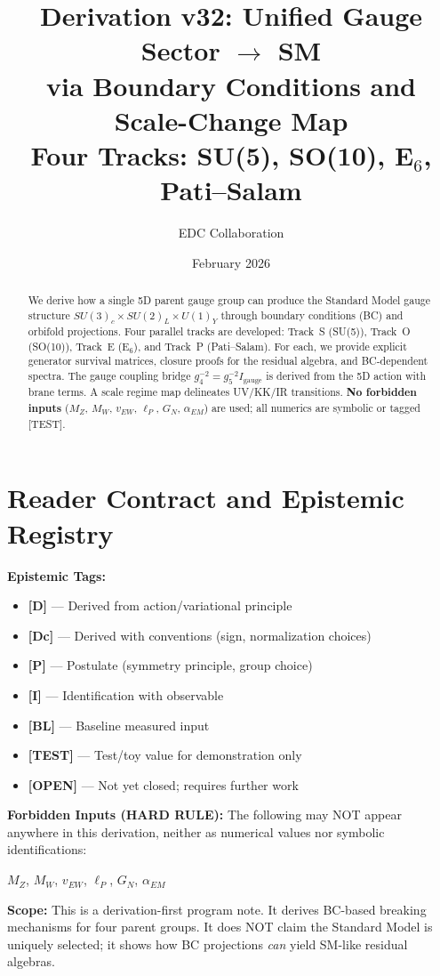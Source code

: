 \documentclass[11pt,a4paper]{article}
\title{Derivation v32: Unified Gauge Sector $\to$ SM\\
via Boundary Conditions and Scale-Change Map\\[0.5em]
\large Four Tracks: SU(5), SO(10), E$_6$, Pati--Salam}
\author{EDC Collaboration}
\date{February 2026}
\begin{document}
\maketitle

\begin{abstract}
We derive how a single 5D parent gauge group can produce the Standard Model gauge
structure $SU(3)_c \times SU(2)_L \times U(1)_Y$ through boundary conditions (BC) and
orbifold projections. Four parallel tracks are developed: Track~S (SU(5)), Track~O
(SO(10)), Track~E (E$_6$), and Track~P (Pati--Salam). For each, we provide explicit
generator survival matrices, closure proofs for the residual algebra, and BC-dependent
spectra. The gauge coupling bridge $g_4^{-2} = g_5^{-2} I_{\text{gauge}}$ is derived
from the 5D action with brane terms. A scale regime map delineates UV/KK/IR transitions.
\textbf{No forbidden inputs} ($M_Z$, $M_W$, $v_{EW}$, $\ell_P$, $G_N$, $\alpha_{EM}$)
are used; all numerics are symbolic or tagged [TEST].
\end{abstract}

\tableofcontents
\newpage

\section{Reader Contract and Epistemic Registry}
\label{sec:contract}

\begin{readercontract}
\textbf{Epistemic Tags:}
\begin{itemize}
  \item \textbf{[D]} --- Derived from action/variational principle
  \item \textbf{[Dc]} --- Derived with conventions (sign, normalization choices)
  \item \textbf{[P]} --- Postulate (symmetry principle, group choice)
  \item \textbf{[I]} --- Identification with observable
  \item \textbf{[BL]} --- Baseline measured input
  \item \textbf{[TEST]} --- Test/toy value for demonstration only
  \item \textbf{[OPEN]} --- Not yet closed; requires further work
\end{itemize}

\textbf{Forbidden Inputs (HARD RULE):} The following may NOT appear anywhere in this
derivation, neither as numerical values nor symbolic identifications:
\begin{center}
$M_Z$, $M_W$, $v_{EW}$, $\ell_P$, $G_N$, $\alpha_{EM}$
\end{center}

\textbf{Scope:} This is a derivation-first program note. It derives BC-based breaking
mechanisms for four parent groups. It does NOT claim the Standard Model is uniquely
selected; it shows how BC projections \emph{can} yield SM-like residual algebras.
\end{readercontract}
\end{document}
